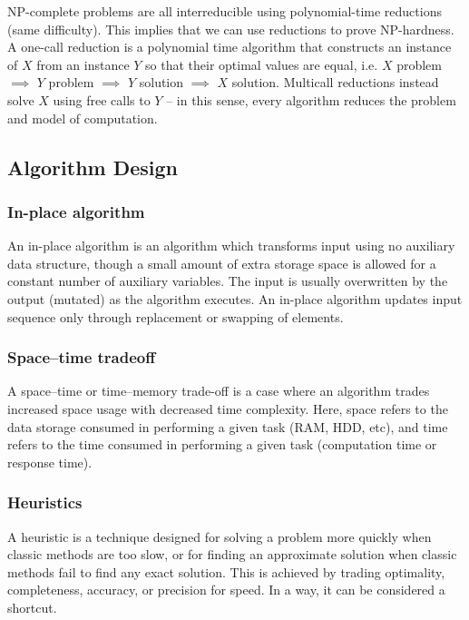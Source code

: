 \documentclass{article}
\begin{document}
    NP-complete problems are all interreducible using polynomial-time reductions (same difficulty). This implies that we can use reductions to prove NP-hardness. A one-call reduction is a polynomial time algorithm that constructs an instance of $X$ from an instance $Y$ so that their optimal values are equal, i.e. $X$ problem $\implies$ $Y$ problem $\implies$ $Y$ solution $\implies$ $X$ solution. Multicall reductions instead solve $X$ using free calls to $Y$ -- in this sense, every algorithm reduces the problem and model of computation.
    
    \subsection{Algorithm Design}
    \subsubsection{In-place algorithm}
        An in-place algorithm is an algorithm which transforms input using no auxiliary data structure, though a small amount of extra storage space is allowed for a constant number of auxiliary variables. The input is usually overwritten by the output (mutated) as the algorithm executes. An in-place algorithm updates input sequence only through replacement or swapping of elements.
        
    \subsubsection{Space–time tradeoff}
        A space–time or time–memory trade-off is a case where an algorithm trades increased space usage with decreased time complexity. Here, space refers to the data storage consumed in performing a given task (RAM, HDD, etc), and time refers to the time consumed in performing a given task (computation time or response time).
        
    \subsubsection{Heuristics}
        A heuristic is a technique designed for solving a problem more quickly when classic methods are too slow, or for finding an approximate solution when classic methods fail to find any exact solution. This is achieved by trading optimality, completeness, accuracy, or precision for speed. In a way, it can be considered a shortcut.
    
\end{document}
